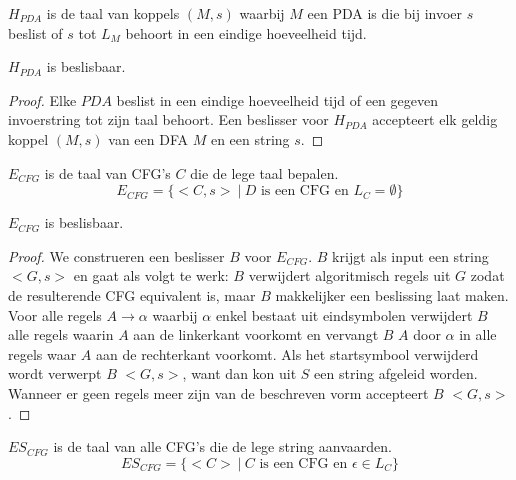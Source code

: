 \documentclass[main.tex]{subfiles}
\begin{document}
\begin{de}
  \label{de:h-pda}
  $H_{PDA}$ is de taal van koppels $(M,s)$ waarbij $M$ een PDA is die bij invoer $s$ beslist of $s$ tot $L_{M}$ behoort in een eindige hoeveelheid tijd.
\end{de}

\begin{st}
  \label{st:h-pda-besl}
  $H_{PDA}$ is beslisbaar.
  
  \begin{proof}
    Elke $PDA$ beslist in een eindige hoeveelheid tijd of een gegeven invoerstring tot zijn taal behoort.
    Een beslisser voor $H_{PDA}$ accepteert elk geldig koppel $(M,s)$ van een DFA $M$ en een string $s$.
  \end{proof}
\end{st}

\begin{de}
  \label{de:e-cfg}
  $E_{CFG}$ is de taal van CFG's $C$ die de lege taal bepalen.
  \[ E_{CFG} = \{ <C,s>\ |\ D \text{ is een CFG en } L_{C} = \emptyset \} \]
\end{de}

\begin{st}
  \label{st:e-cfg-besl}
  $E_{CFG}$ is beslisbaar.

  \begin{proof}
    We construeren een beslisser $B$ voor $E_{CFG}$.
    $B$ krijgt als input een string $<G,s>$ en gaat als volgt te werk:
    $B$ verwijdert algoritmisch regels uit $G$ zodat de resulterende CFG equivalent is, maar $B$ makkelijker een beslissing laat maken.
    Voor alle regels $A \rightarrow \alpha$ waarbij $\alpha$ enkel bestaat uit eindsymbolen verwijdert $B$ alle regels waarin $A$ aan de linkerkant voorkomt en vervangt $B$ $A$ door $\alpha$ in alle regels waar $A$ aan de rechterkant voorkomt.
    Als het startsymbool verwijderd wordt verwerpt $B$ $<G,s>$, want dan kon uit $S$ een string afgeleid worden.
    Wanneer er geen regels meer zijn van de beschreven vorm accepteert $B$ $<G,s>$.
  \end{proof}
\end{st}

\begin{de}
  \label{de:es-cfg}
  $ES_{CFG}$ is de taal van alle CFG's die de lege string aanvaarden.
  \[ ES_{CFG} = \{ <C> \ |\ C \text{ is een CFG en } \epsilon \in L_{C}\} \]
\end{de}
\end{document}
